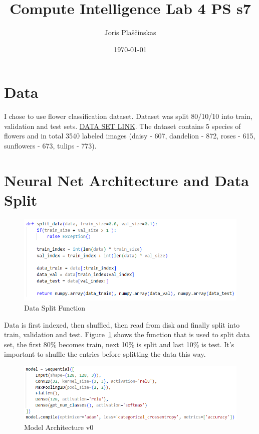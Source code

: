 \documentclass{article}
\title{Compute Intelligence Lab 4 PS s7}
\author{Joris Plaščinskas}
\date{\today}
\begin{document}
\maketitle
\section*{Data}
I chose to use flower classification dataset. Dataset was split 80/10/10 into train, validation and test sets. \href{https://www.kaggle.com/datasets/sauravagarwal/flower-classification}{DATA SET LINK}. The dataset contains 5 species of flowers and in total 3540 labeled images (daisy - 607, dandelion - 872, roses - 615, sunflowers - 673, tulips - 773).

\section*{Neural Net Architecture and Data Split}
\begin{figure}[H]
    \centering
    \includegraphics[width=1\textwidth]{data-split.png}
    \caption{Data Split Function}
    \label{fig:data-split}
\end{figure}
Data is first indexed, then shuffled, then read from disk and finally split into train, validation and test. Figure~\ref{fig:data-split} shows the function that is used to split data set, the first 80\% becomes train, next 10\% is split and last 10\% is test. It's important to shuffle the entries before splitting the data this way.
\begin{figure}[H]
    \centering
    \includegraphics[width=1\textwidth]{architecture-0.png}
    \caption{Model Architecture v0}
    \label{fig:architecture-0}
\end{figure}
\end{document}
